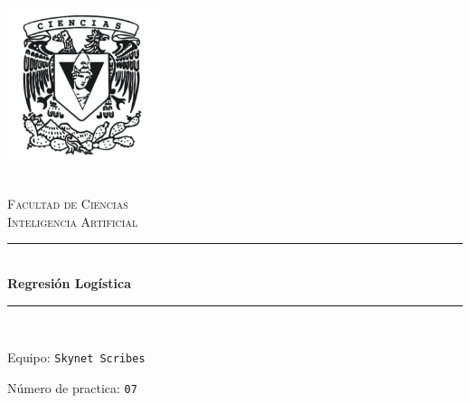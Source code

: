 \begin{titlepage}
\center 
\newcommand{\HRule}{\rule{\linewidth}{0.5mm}} 

\includegraphics[width=4.5cm]{IMA/cienciasWhite.png}

\quad \\[0.2cm]
\textsc{\huge Facultad de Ciencias}\\[.6cm] 
\textsc{\huge Inteligencia Artificial}\\[0.5cm]

\makeatletter
    \HRule \\ [0.4cm]
        { \huge \bfseries Regresión Logística}\\
    \HRule \\ [0.4cm]
    
\vspace{2mm}

\begin{flushleft}
    \Large{Equipo:} \texttt{\Large Skynet Scribes}
\end{flushleft}
\begin{flushleft}
    \Large{Número de practica:} \texttt{\Large 07}\\[0.8cm]
\end{flushleft}


\begin{minipage}{0.8\textwidth}
    \begin{flushright}
            
    \end{flushright}
\end{minipage}    


\end{titlepage}
